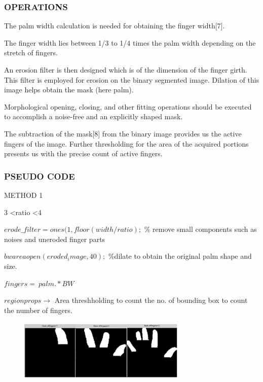 \documentclass[conference]{IEEEtran}
\begin{document}
\subsubsection{OPERATIONS}
The palm width calculation is needed for obtaining the finger width[7].

The finger width lies between 1/3 to 1/4 times the palm width depending on the stretch of fingers.

An erosion filter is then designed which is of the dimension of the finger girth. This filter is employed for erosion on the binary segmented image. Dilation of this image helps obtain the mask (here palm).

Morphological opening, closing, and other fitting operations should be executed to accomplish a noise-free and an explicitly shaped mask.

The subtraction of the mask[8] from the binary image provides us the active fingers of the image. Further thresholding for the area of the acquired portions presents us with the precise count of active fingers.


\subsubsection{PSEUDO CODE}

METHOD 1 

 3 \textless ratio \textless 4 

$erode\_filter=ones(1,floor(width/ratio); $ \% remove small components such as noises and uneroded finger parts
 
$bwareaopen(eroded_image,40);$ \%dilate to obtain the original palm shape and size. 

$fingers=~palm.*BW$ 

$regionprops \rightarrow$ Area threshholding to count the no. of bounding box to count the number of fingers.

\begin{figure}[h!]
	\centering
	\includegraphics[width = 8cm, height = 3cm]{method1_1}
\end{figure}
\end{document}
